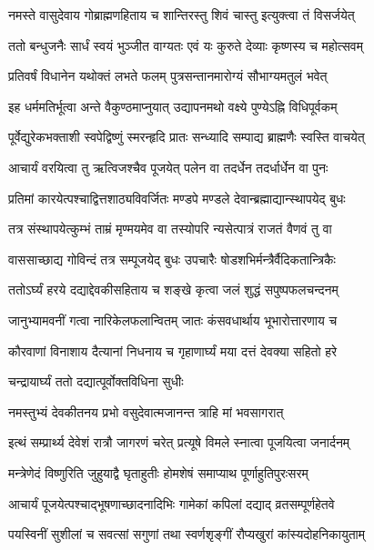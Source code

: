 \twolineshloka
{नमस्ते वासुदेवाय गोब्राह्मणहिताय च}
{शान्तिरस्तु शिवं चास्तु इत्युक्त्वा तं विसर्जयेत्} %

\twolineshloka
{ततो बन्धुजनैः सार्धं स्वयं भुञ्जीत वाग्यतः}
{एवं यः कुरुते देव्याः कृष्णस्य च महोत्सवम्} %

\twolineshloka
{प्रतिवर्षं विधानेन यथोक्तं लभते फलम्}
{पुत्रसन्तानमारोग्यं सौभाग्यमतुलं भवेत्} %

\twolineshloka
{इह धर्ममतिर्भूत्वा अन्ते वैकुण्ठमाप्नुयात्}
{उद्यापनमथो वक्ष्ये पुण्येऽह्नि विधिपूर्वकम्} %

\twolineshloka
{पूर्वेद्युरेकभक्ताशी स्वपेद्विष्णुं स्मरन्हृदि}
{प्रातः सन्ध्यादि सम्पाद्य ब्राह्मणैः स्वस्ति वाचयेत्} %

\twolineshloka
{आचार्यं वरयित्वा तु ऋत्विजश्चैव पूजयेत्}
{पलेन वा तदर्धेन तदर्धार्धेन वा पुनः} %

\twolineshloka
{प्रतिमां कारयेत्पश्चाद्वित्तशाठ्यविवर्जितः}
{मण्डपे मण्डले देवान्ब्रह्माद्यान्स्थापयेद् बुधः} %

\twolineshloka
{तत्र संस्थापयेत्कुम्भं ताम्रं मृण्मयमेव वा}
{तस्योपरि न्यसेत्पात्रं राजतं वैणवं तु वा} %

\twolineshloka
{वाससाच्छाद्य गोविन्दं तत्र सम्पूजयेद् बुधः}
{उपचारैः षोडशभिर्मन्त्रैर्वैदिकतान्त्रिकैः} %

\twolineshloka
{ततोऽर्घ्यं हरये दद्याद्देवकीसहिताय च}
{शङ्खे कृत्वा जलं शुद्धं सपुष्पफलचन्दनम्} %

\twolineshloka
{जानुभ्यामवनीं गत्वा नारिकेलफलान्वितम्}
{जातः कंसवधार्थाय भूभारोत्तारणाय च} %

\twolineshloka
{कौरवाणां विनाशाय दैत्यानां निधनाय च}
{गृहाणार्घ्यं मया दत्तं देवक्या सहितो हरे} %

\onelineshloka
{चन्द्रायार्घ्यं ततो दद्यात्पूर्वोक्तविधिना सुधीः} %

\twolineshloka
{नमस्तुभ्यं देवकीतनय प्रभो}
{वसुदेवात्मजानन्त त्राहि मां भवसागरात्} %

\twolineshloka
{इत्थं सम्प्रार्थ्य देवेशं रात्रौ जागरणं चरेत्}
{प्रत्यूषे विमले स्नात्वा पूजयित्वा जनार्दनम्} %

\twolineshloka
{मन्त्रेणेदं विष्णुरिति जुहुयाद्वै घृताहुतीः}
{होमशेषं समाप्याथ पूर्णाहुतिपुरःसरम्} %

\twolineshloka
{आचार्यं पूजयेत्पश्चाद्भूषणाच्छादनादिभिः}
{गामेकां कपिलां दद्याद् व्रतसम्पूर्णहेतवे} %

\twolineshloka
{पयस्विनीं सुशीलां च सवत्सां सगुणां तथा}
{स्वर्णशृङ्गीं रौप्यखुरां कांस्यदोहनिकायुताम्} %

